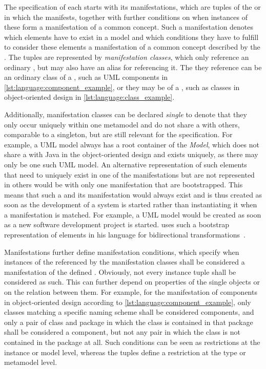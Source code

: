 The specification of each \commonality starts with its manifestations, which are \metaclass tuples of the \concretemetamodels or \conceptmetamodels in which the \commonality manifests, together with further conditions on when instances of these \metaclasses form a manifestation of a common concept.
Such a manifestation denotes which elements have to exist in a model and which conditions they have to fulfill to consider these elements a manifestation of a common concept described by the \commonality.
The \metaclass tuples are represented by \emph{manifestation classes}, which only reference an ordinary \metaclass, but may also have an alias for referencing it.
The \metaclass they reference can be an ordinary class of a \concretemetamodels, such as \gls{UML} components in \autoref{lst:language:component_example}, or they may be \commonalities of a \conceptmetamodel, such as classes in object-oriented design in \autoref{lst:language:class_example}.

Additionally, manifestation classes can be declared \emph{single} to denote that they only occur uniquely within one metamodel and do not share a \commonality with others, comparable to a singleton, but are still relevant for the \commonalities specification.
For example, a \gls{UML} model always has a root container of the \metaclass \emph{Model}, which does not share a \commonality with Java in the object-oriented design \conceptmetamodel and exists uniquely, as there may only be one such \gls{UML} model.
An alternative representation of such elements that need to uniquely exist in one of the manifestations but are not represented in others would be \commonalities with only one manifestation that are bootstrapped.
This means that such a \commonality and its manifestation would always exist and is thus created as soon as the development of a system is started rather than instantiating it when a manifestation is matched.
For example, a \gls{UML} model would be created as soon as a new software development project is started.
\citeauthor{kramer2017a} uses such a bootstrap representation of elements in his \mappings language for bidirectional transformations~\cite[Sec. 7.1]{kramer2017a}.

Manifestations further define manifestation conditions, which specify when instances of the \metaclasses referenced by the manifestation classes shall be considered a manifestation of the defined \commonality.
Obviously, not every instance tuple shall be considered as such.
This can further depend on properties of the single objects or on the relation between them.
For example, for the manifestation of components in object-oriented design according to \autoref{lst:language:component_example}, only classes matching a specific naming scheme shall be considered components, and only a pair of class and package in which the class is contained in that package shall be considered a component, but not any pair in which the class is not contained in the package at all.
Such conditions can be seen as restrictions at the instance or model level, whereas the \metaclass tuples define a restriction at the type or metamodel level.


